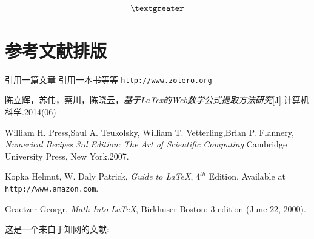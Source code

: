 \documentclass[12pt]{ctexbook}  %
\begin{document}
$$\textgreater$$


	\chapter{参考文献排版}
	引用一篇文章\cite{artcle1} 引用一本书\cite{book1}等等	\texttt{http://www.zotero.org}
	\begin{thebibliography}{99}
		陈立辉，苏伟，蔡川，陈晓云，\emph{基于LaTex的Web数学公式提取方法研究}[J].计算机科学.2014(06)
		
		William H. Press,Saul A. Teukolsky, William T. Vetterling,Brian P. Flannery,
		\emph{Numerical Recipes 3rd Edition: The Art of Scientific Computing} Cambridge University Press, New York,2007.
		
		 Kopka Helmut, W. Daly Patrick,
		\emph{Guide to \LaTeX}, $4^{th}$ Edition.
		Available at \texttt{http://www.amazon.com}.
		
		 Graetzer Georgr, \emph{Math Into \LaTeX},
		Birkhuser Boston; 3 edition (June 22, 2000).
	\end{thebibliography}
	这是一个来自于知网的文献:\cite{wimolmalaEnhancedXrayShielding2021}
	
	
	
	
\end{document}
